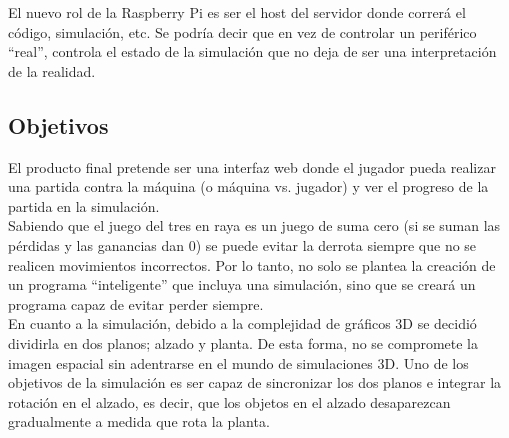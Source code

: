 \documentclass[11pt]{article}
\begin{document}
El nuevo rol de la Raspberry Pi es ser el host del servidor donde correrá el
código, simulación, etc. Se podría decir que en vez de controlar un periférico
``real'', controla el estado de la simulación que no deja de ser una
interpretación de la realidad.


\subsection{Objetivos}
El producto final pretende ser una interfaz web donde el jugador pueda realizar
una partida contra la máquina (o máquina vs. jugador) y ver el progreso de la
partida en la simulación. \\

Sabiendo que el juego del tres en raya es un juego de suma cero (si se suman las
pérdidas y las ganancias dan 0) se puede evitar la derrota siempre que no se
realicen movimientos incorrectos. Por lo tanto, no solo se plantea la creación
de un programa ``inteligente'' que incluya una simulación, sino que se creará un
programa capaz de evitar perder siempre. \\

En cuanto a la simulación, debido a la complejidad de gráficos 3D se decidió
dividirla en dos planos; alzado y planta. De esta forma, no se compromete la
imagen espacial sin adentrarse en el mundo de simulaciones 3D. Uno de los
objetivos de la simulación es ser capaz de sincronizar los dos planos e integrar
la rotación en el alzado, es decir, que los objetos en el alzado desaparezcan
gradualmente a medida que rota la planta. \\
\end{document}
